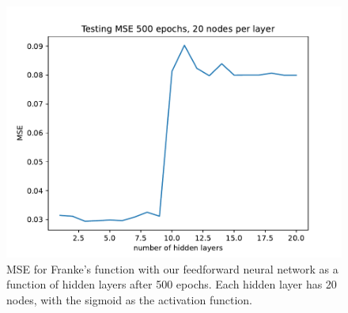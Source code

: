 \documentclass[aps,reprint,superscriptaddress,nofootinbib]{revtex4-2}
\begin{document}
\begin{figure}[htp]
    \centering
    \includegraphics[width=\linewidth]{figures/part_c/3_mse_layers.pdf}
    \caption{MSE for Franke's function with our feedforward neural network as a function of hidden layers after 500 epochs. Each hidden layer has 20 nodes, with the sigmoid as the activation function.}
    \label{fig:mse_hidd_lay}
\end{figure}




\end{document}
